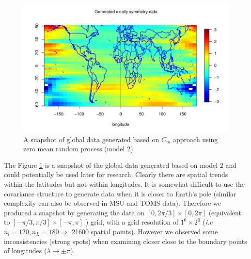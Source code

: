 \begin{figure}[H]
	\centering
		\includegraphics [width=1\textwidth ]{graphs/Data_sample_120_model2_withmap.pdf}
		\caption[A Snapshot of Global Data Generated Based on $C_m$ Approach using Zero]{A snapshot of global data generated based on $C_m$ approach using zero mean random process (model 2)}
		\label{grid_plot_model_2}
\end{figure}
The Figure \ref{grid_plot_model_2} is a snapshot of the global data generated based on model 2 and could potentially be used later for research. Clearly there are spatial trends within the latitudes but not within longitudes. It is somewhat difficult to use the covariance structure to generate data when it is closer to Earth's pole (similar complexity can also be observed in MSU and TOMS data). Therefore we produced a snapshot by generating the data on $[0,2\pi/3] \times [0,2\pi]$ (equivalent to $[-\pi/3,\pi/3] \times [-\pi,\pi]$ ) grid, with a grid resolution of $1^0\times 2^0$ ({\em i.e } $n_l = 120, n_L=180 \Rightarrow$ 21600 spatial points). However we observed some inconsistencies (strong spots) when examining closer close to the boundary points of longitudes ($\lambda \rightarrow \pm \pi$).

